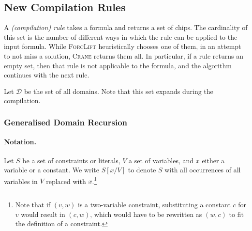 

\subsection{New Compilation Rules}\label{sec:rules}

A \emph{(compilation) rule} takes a formula and returns a set of chips. The
cardinality of this set is the number of different ways in which the rule can be
applied to the input formula. While \textsc{ForcLift}
\citep{DBLP:conf/ijcai/BroeckTMDR11} heuristically chooses one of them, in an
attempt to not miss a solution, \textsc{Crane} returns them all. In particular,
if a rule returns an empty set, then that rule is not applicable to the formula,
and the algorithm continues with the next rule.

Let $\mathcal{D}$ be the set of all domains. Note that this set expands during
the compilation.

\subsubsection{Generalised Domain Recursion}\label{sec:dr}

\paragraph{Notation.}
Let $S$ be a set of constraints or literals, $V$ a set of variables, and $x$
either a variable or a constant. We write $S[x/V]$ to denote $S$ with all
occurrences of all variables in $V$ replaced with $x$.\footnote{Note that if
  $(v, w)$ is a two-variable constraint, substituting a constant $c$ for $v$
  would result in $(c, w)$, which would have to be rewritten as $(w, c)$ to fit
  the definition of a constraint.} 


